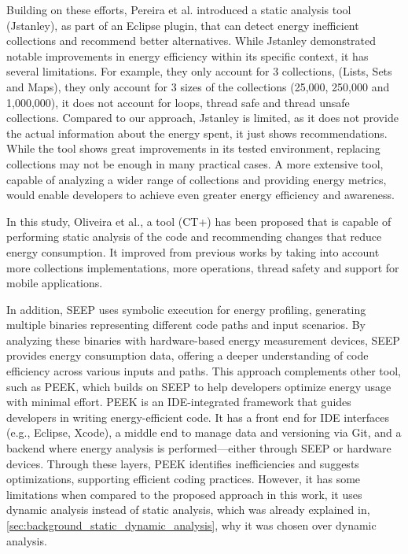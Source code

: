 \documentclass[sigplan]{acmart}
\begin{document}
Building on these efforts, Pereira et al.\cite{10.1145/3238147.3240473} introduced a static analysis tool (Jstanley), as part of an Eclipse plugin, that can detect energy inefficient collections and recommend better alternatives. While Jstanley demonstrated notable improvements in energy efficiency within its specific context, it has several limitations.
For example, they only account for 3 collections, (Lists, Sets and Maps), they only account for 3 sizes of the collections (25,000, 250,000 and 1,000,000), it does not account for loops, thread safe and thread unsafe collections. Compared to our approach, Jstanley is limited, as it does not provide the actual information about the energy spent, it just shows recommendations. While the tool shows great improvements in its tested environment, replacing collections may not be enough in many practical cases. A more extensive tool, capable of analyzing a wider range of collections and providing energy metrics, would enable developers to achieve even greater energy efficiency and awareness.

In this study, Oliveira et al.\cite{8816747}, a tool (CT+) has been proposed that is capable of performing static analysis of the code and recommending changes that reduce energy consumption. It improved from previous works by taking into account more collections implementations, more operations, thread safety and support for mobile applications. 

In addition, SEEP \cite{10.1145/2094091.2094106} uses symbolic execution for energy profiling, generating multiple binaries representing different code paths and input scenarios. By analyzing these binaries with hardware-based energy measurement devices, SEEP provides energy consumption data, offering a deeper understanding of code efficiency across various inputs and paths. This approach complements other tool, such as PEEK\cite{187026}, which builds on SEEP to help developers optimize energy usage with minimal effort. PEEK is an IDE-integrated framework that guides developers in writing energy-efficient code. It has a front end for IDE interfaces (e.g., Eclipse, Xcode), a middle end to manage data and versioning via Git, and a backend where energy analysis is performed—either through SEEP or hardware devices. Through these layers, PEEK identifies inefficiencies and suggests optimizations, supporting efficient coding practices. However, it has some limitations when compared to the proposed approach in this work, it uses dynamic analysis instead of static analysis, which was already explained in, \ref{sec:background_static_dynamic_analysis}, why it was chosen over dynamic analysis.
\end{document}
